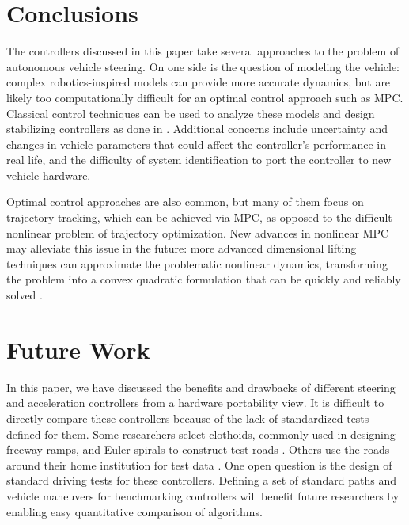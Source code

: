 \documentclass[conference]{IEEEtran}
\begin{document}
\section{Conclusions}
The controllers discussed in this paper take several approaches to the problem of autonomous vehicle steering. On one side is the question of modeling the vehicle: complex robotics-inspired models can provide more accurate dynamics, but are likely too computationally difficult for an optimal control approach such as MPC. Classical control techniques can be used to analyze these models and design stabilizing controllers as done in \cite{CHEBLY201712526}. Additional concerns include uncertainty and changes in vehicle parameters that could affect the controller's performance in real life, and the difficulty of system identification to port the controller to new vehicle hardware.

Optimal control approaches are also common, but many of them focus on trajectory tracking, which can be achieved via MPC, as opposed to the difficult nonlinear problem of trajectory optimization. New advances in nonlinear MPC may alleviate this issue in the future: more advanced dimensional lifting techniques can approximate the problematic nonlinear dynamics, transforming the problem into a convex quadratic formulation that can be quickly and reliably solved \cite{Korda_2018}.

\section{Future Work}

In this paper, we have discussed the benefits and drawbacks of different steering and acceleration controllers from a hardware portability view. It is difficult to directly compare these controllers because of the lack of standardized tests defined for them. Some researchers select clothoids, commonly used in designing freeway ramps, and Euler spirals to construct test roads \cite{pid}. Others use the roads around their home institution for test data \cite{farag}. One open question is the design of standard driving tests for these controllers. Defining a set of standard paths and vehicle maneuvers for benchmarking controllers will benefit future researchers by enabling easy quantitative comparison of algorithms.
\end{document}
